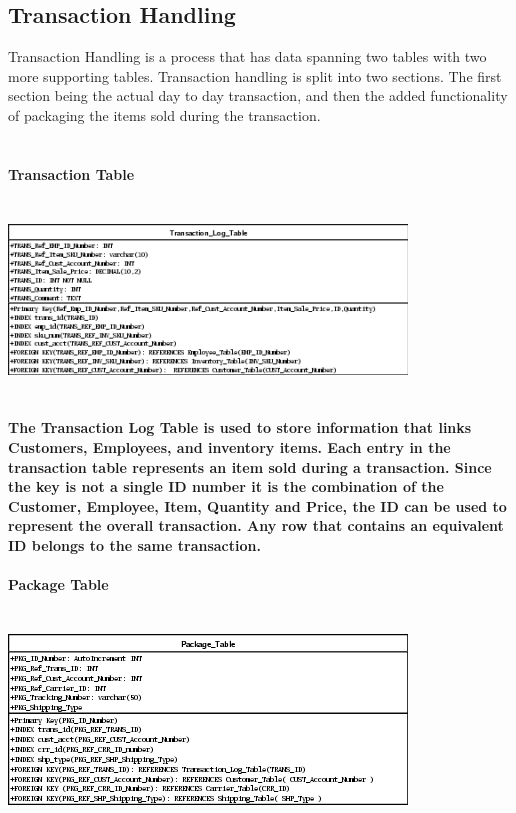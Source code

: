 \documentclass{report}
\begin{document}
	\subsection{Transaction Handling}

	Transaction Handling is a process that has data spanning two tables with two more supporting
	tables. Transaction handling is split into two sections. The first section being the actual
	day to day transaction, and then the added functionality of packaging the items sold during
	the transaction.\\
	\\
	\\
	\bf{Transaction Table}\\
	\\
	\\
	\includegraphics{Tables/TransactionLogTable.png}\\
	\\
	\\
	The Transaction Log Table is used to store information that links Customers, Employees, and
	inventory items. Each entry in the transaction table represents an item sold during a transaction.
	Since the key is not a single ID number it is the combination of the Customer, Employee, Item,
	Quantity and Price, the ID can be used to represent the overall transaction. Any row that contains
	an equivalent ID belongs to the same transaction.
	\\
	\\
	\bf{Package Table}\\
	\\
	\\
	\includegraphics{Tables/PackageTable.png}\\
\end{document}
